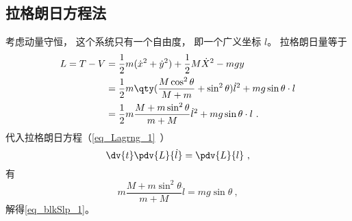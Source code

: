 \subsection{拉格朗日方程法}
考虑动量守恒， 这个系统只有一个自由度， 即一个广义坐标 $l$。 拉格朗日量等于
\begin{equation}
\begin{aligned}
L = T - V &= \frac12 m(\dot x^2 + \dot y^2) + \frac12 M \dot X^2 - mgy\\
&= \frac{1}{2}m \qty( \frac{M\cos^2\theta}{M + m}+\sin^2\theta) \dot l^2 + mg\sin\theta \cdot l\\
&=\frac{1}{2}m\frac{M+m\sin^2\theta}{m+M}\dot{l}^2+mg\sin\theta\cdot l~.
\end{aligned}
\end{equation}
代入拉格朗日方程（\autoref{eq_Lagrng_1}~）
\begin{equation}
\dv{t} \pdv{L}{\dot l} = \pdv{L}{l}~,
\end{equation}
有
\begin{equation}
m\frac{M+m\sin^2\theta}{m+M}\ddot{l}=mg\sin\theta~,
\end{equation}
解得\autoref{eq_blkSlp_1}。
